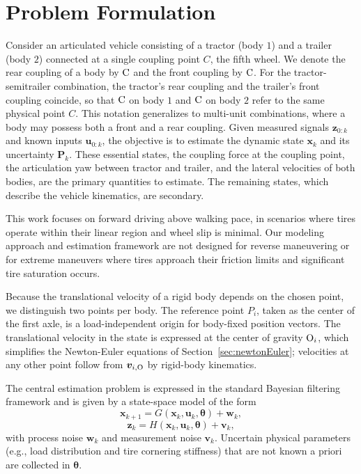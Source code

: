 \documentclass[conference]{IEEEtran}
\begin{document}
\section{Problem Formulation}
\label{sec:problem}
Consider an articulated vehicle consisting of a tractor (body $1$) and a trailer (body $2$) connected at a single coupling point $C$, the fifth wheel. We denote the rear coupling of a body by $\text{C}$ and the front coupling by $\text{C}$. For the tractor-semitrailer combination, the tractor's rear coupling and the trailer's front coupling coincide, so that $\text{C}$ on body $1$ and $\text{C}$ on body $2$ refer to the same physical point $C$. This notation generalizes to multi-unit combinations, where a body may possess both a front and a rear coupling.
Given measured signals $\bm z_{0:k}$ and known inputs $\bm u_{0:k}$, the objective is to estimate the dynamic state $\bm x_k$ and its uncertainty $\bm P_k$.
These essential states, the coupling force at the coupling point, the articulation yaw between tractor and trailer, and the lateral velocities of both bodies, are the primary quantities to estimate. The remaining states, which describe the vehicle kinematics, are secondary.

This work focuses on forward driving above walking pace, in scenarios where tires operate within their linear region and wheel slip is minimal. Our modeling approach and estimation framework are not designed for reverse maneuvering or for extreme maneuvers where tires approach their friction limits and significant tire saturation occurs.

Because the translational velocity of a rigid body depends on the chosen point, we distinguish two points per body. The reference point $P_i$, taken as the center of the first axle, is a load-independent origin for body-fixed position vectors. The translational velocity in the state is expressed at the center of gravity $\text{O}_i$, which simplifies the Newton-Euler equations of Section~\ref{sec:newtonEuler}; velocities at any other point follow from $\bm v_{i,\text{O}}$ by rigid-body kinematics.

The central estimation problem is expressed in the standard Bayesian filtering framework and is given by a state-space model of the form
\begin{equation}
\bm x_{k+1} = G(\bm x_k,\bm u_k,\bm \theta) + \bm w_k,
\end{equation}
\begin{equation}
\bm z_k = H(\bm x_k,\bm u_k,\bm \theta) + \bm v_k,
\end{equation}
with process noise $\bm w_k$ and measurement noise $\bm v_k$.
Uncertain physical parameters (e.g., load distribution and tire cornering stiffness) that are not known a priori are collected in $\bm\theta$.
\end{document}
